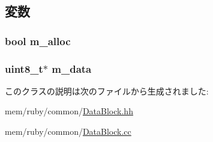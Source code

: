 \subsection{変数}
\hypertarget{classDataBlock_a225f13db079994c51d6fc64651239d70}{
\subsubsection[{m\_\-alloc}]{\setlength{\rightskip}{0pt plus 5cm}bool {\bf m\_\-alloc}}}
\label{classDataBlock_a225f13db079994c51d6fc64651239d70}
\hypertarget{classDataBlock_a8b84eba161b544d25b6f99000ffaba8c}{
\subsubsection[{m\_\-data}]{\setlength{\rightskip}{0pt plus 5cm}uint8\_\-t$\ast$ {\bf m\_\-data}}}
\label{classDataBlock_a8b84eba161b544d25b6f99000ffaba8c}


このクラスの説明は次のファイルから生成されました:\begin{DoxyCompactItemize}
\item 
mem/ruby/common/\hyperlink{DataBlock_8hh}{DataBlock.hh}\item 
mem/ruby/common/\hyperlink{DataBlock_8cc}{DataBlock.cc}\end{DoxyCompactItemize}
